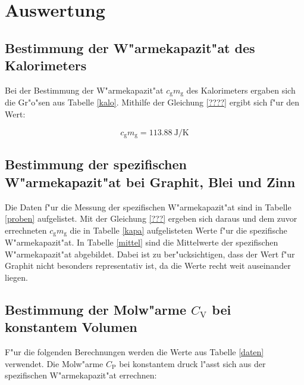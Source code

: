\section{Auswertung}
\label{sec:auswertung}

\subsection{Bestimmung der W"armekapazit"at des Kalorimeters} %
\label{sub:bestimmung_der_w_armekapazit_at_des_kalorimeters}



Bei der Bestimmung der W"armekapazit"at $c_\mathrm{g}m_\mathrm{g}$ des Kalorimeters ergaben sich die Gr"o"sen aus Tabelle \ref{kalo}.
Mithilfe der Gleichung \eqref{????} ergibt sich f"ur den Wert:

\begin{equation}
	c_\mathrm{g}m_\mathrm{g} = \SI{113.88}{\joule\per\kelvin}
\end{equation}

\subsection{Bestimmung der spezifischen W"armekapazit"at bei Graphit, Blei und Zinn} %
\label{sub:bestimmung_der_spezifischen_w_armekapazit_at_bei_graphit_blei_und_zinn}




Die Daten f"ur die Messung der spezifischen W"armekapazit"at sind in Tabelle \ref{proben} aufgelistet.
Mit der Gleichung \eqref{???} ergeben sich daraus und dem zuvor errechneten $c_\mathrm{g}m_\mathrm{g}$ die in Tabelle \ref{kapa} aufgelisteten Werte f"ur die spezifische W"armekapazit"at.
In Tabelle \ref{mittel} sind die Mittelwerte der spezifischen W"armekapazit"at abgebildet. Dabei ist zu ber"ucksichtigen, dass der Wert f"ur Graphit nicht besonders representativ ist, da die Werte recht weit auseinander liegen.



\subsection{Bestimmung der Molw"arme $C_\mathrm{V}$ bei konstantem Volumen} %
\label{sub:bestimmung_der_molw_arme_c_mathrm}



F"ur die folgenden Berechnungen werden die Werte aus Tabelle \ref{daten} verwendet.
Die Molw"arme $C_\mathrm{P}$ bei konstantem druck l"asst sich aus der spezifischen W"armekapazit"at errechnen:

